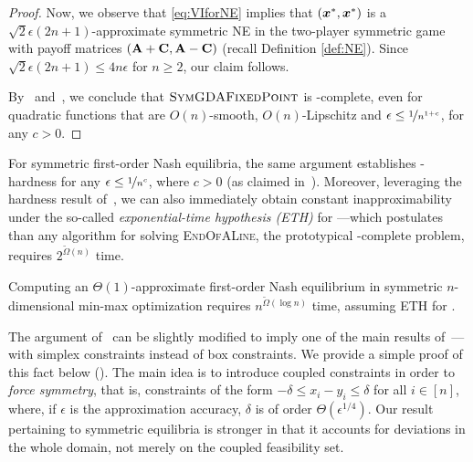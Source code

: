 \begin{proof}
Now, we observe that \eqref{eq:VIforNE} implies that $({\bm{x}}^*,{\bm{x}}^*)$ is a $\sqrt{2}\epsilon\left(2n+1\right)$-approximate symmetric NE in the two-player symmetric game with payoff matrices $(\mathbf{A}+\mathbf{C},\mathbf{A}-\mathbf{C})$ (recall Definition \eqref{def:NE}). Since $\sqrt{2}\epsilon\left(2n+1\right) \leq 4n\epsilon$ for $n\geq 2$, our claim follows.

By~ and~, we conclude that $\textsc{SymGDAFixedPoint}$ is \PPAD-complete, even for quadratic functions that are $O(n)$-smooth, $O(n)$-Lipschitz and $\epsilon \leq \nicefrac{1}{n^{1+c}}$, for any $c>0$.
\end{proof}

For symmetric first-order Nash equilibria, the same argument establishes \PPAD-hardness for any $\epsilon \leq \nicefrac{1}{n^c}$, where $c > 0$ (as claimed in~). Moreover, leveraging the hardness result of~\citet{Rubinstein16:Settling}, we can also immediately obtain constant inapproximability under the so-called \emph{exponential-time hypothesis (ETH)} for \PPAD---which postulates than any algorithm for solving \textsc{EndOfALine}, the prototypical \PPAD-complete problem, requires $2^{\tilde{\Omega}(n)}$ time.

\begin{corollary}
    \label{cor:constant}
    Computing an $\Theta(1)$-approximate first-order Nash equilibrium in symmetric $n$-dimensional min-max optimization requires $n^{\tilde{\Omega}(\log n)}$ time, assuming ETH for \PPAD.
\end{corollary}

\begin{remark} The argument of~ can be slightly modified to imply one of the main results of~\citet{DSZ21}---with simplex constraints instead of box constraints. We provide a simple proof of this fact below (). The main idea is to introduce coupled constraints in order to \emph{force symmetry}, that is, constraints of the form $-\delta \leq x_i - y_i \leq \delta$ for all $i \in [n]$, where, if $\epsilon$ is the approximation accuracy, $\delta$ is of order $\Theta\left(\epsilon^{1/4}\right)$. Our result pertaining to symmetric equilibria is stronger in that it accounts for deviations in the whole domain, not merely on the coupled feasibility set. 
\end{remark}

